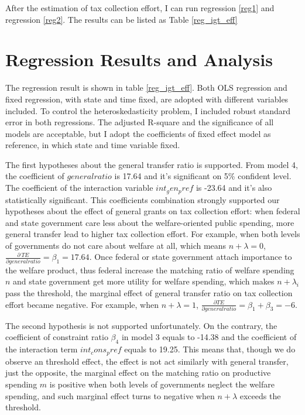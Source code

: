After the estimation of tax collection effort, I can run regression \ref{reg1} and regression \ref{reg2}. The results can be listed as Table \ref{reg_igt_eff}

\section{Regression Results and Analysis}

The regression result is shown in table \ref{reg_igt_eff}. Both OLS regression and fixed regression, with state and time fixed, are adopted with different variables included. To control the heteroskedasticity problem, I included robust standard error in both regressions. The adjusted R-square and the significance of all models are acceptable, but I adopt the coefficients of fixed effect model as reference, in which state and time variable fixed.

The first hypotheses about the general transfer ratio is supported. From model 4, the coefficient of $generalratio$ is 17.64 and it's significant on 5\% confident level. The coefficient of the interaction variable $int_gen_pref$ is -23.64 and it's also statistically significant. This coefficients combination strongly supported our hypotheses about the effect of general grants on tax collection effort: when federal and state government care less about the welfare-oriented public spending, more general transfer lead to higher tax collection effort. For example, when both levels of governments do not care about welfare at all, which means $n+\lambda=0$, $\frac{\partial\ TE}{\partial generalratio}=\beta_1=17.64$. Once federal or state government attach importance to the welfare product, thus federal increase the matching ratio of welfare spending $n$ and state government get more utility for welfare spending, which makes $n+\lambda_i$ pass the threshold, the marginal effect of general transfer ratio on tax collection effort became negative. For example, when $n+\lambda=1$, $\frac{\partial TE}{\partial generalratio}=\beta_1+\beta_3=-6$.

The second hypothesis is not supported unfortunately. On the contrary, the coefficient of constraint ratio $\beta_4$ in model 3 equals to -14.38 and the coefficient of the interaction term $int_cons_pref$ equals to 19.25. This means that, though we do observe an threshold effect, the effect is not act similarly with general transfer, just the opposite, the marginal effect on the matching ratio on productive spending $m$ is positive when both levels of governments neglect the welfare spending, and such marginal effect turns to negative when $n+\lambda$ exceeds the threshold.

